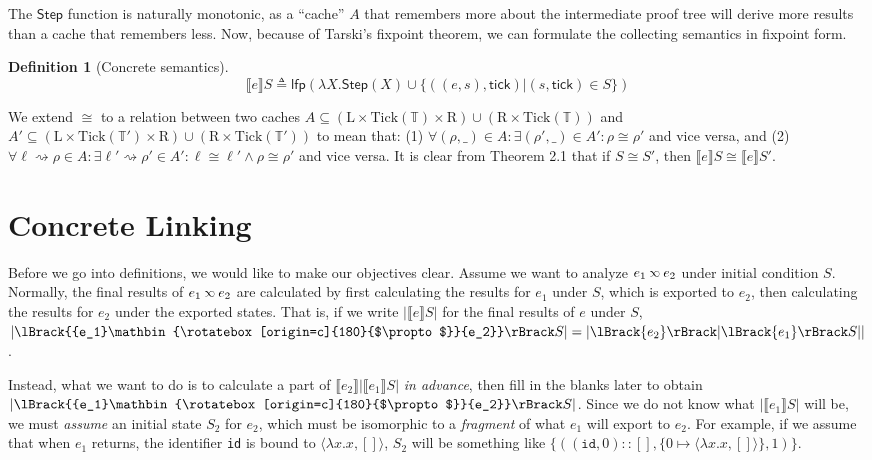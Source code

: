 \documentclass[acmsmall,review]{acmart}\settopmatter{printfolios=true,printccs=false,printacmref=false}
\theoremstyle{definition}
\newtheorem{definition}{Definition}[section]
\newcommand*{\cons}{::}
\newcommand*{\Time}{\mathbb{T}}
\newcommand*{\Left}{\text{L}}
\newcommand*{\Right}{\text{R}}
\newcommand*{\Tick}{\text{Tick}}
\newcommand*{\semarrow}{\rightsquigarrow}
\newcommand*{\semlink}{\mathbin{\rotatebox[origin=c]{180}{$\propto$}}}
\newcommand*{\link}[2]{{#1}\semlink{#2}}
\newcommand*{\sembracket}[1]{\lBrack{#1}\rBrack}
\newcommand*{\tick}{\mathsf{tick}}
\begin{document}
The $\mathsf{Step}$ function is naturally monotonic, as a ``cache'' $A$ that remembers more about the intermediate proof tree will derive more results than a cache that remembers less.
Now, because of Tarski's fixpoint theorem, we can formulate the collecting semantics in fixpoint form.
\begin{definition}[Concrete semantics]
  \[
    \sembracket{e}S\triangleq\mathsf{lfp}(\lambda X.\mathsf{Step}(X)\cup\{((e,s),\tick)|(s,\tick)\in S\})
  \]
\end{definition}
We extend $\cong$ to a relation between two caches $A\subseteq(\Left\times\Tick(\Time)\times\Right )\cup(\Right\times\Tick(\Time))$ and $A'\subseteq(\Left\times\Tick(\Time')\times\Right )\cup(\Right\times\Tick(\Time'))$ to mean that: (1) $\forall(\rho,\_)\in A:\exists(\rho',\_)\in A':\rho\cong\rho'$ and vice versa, and (2) $\forall\ell\semarrow\rho\in A:\exists\ell'\semarrow\rho'\in A':\ell\cong\ell'\wedge\rho\cong\rho'$ and vice versa.
It is clear from Theorem 2.1 that if $S\cong S'$, then $\sembracket{e}S\cong\sembracket{e}S'$.

\section{Concrete Linking}

Before we go into definitions, we would like to make our objectives clear.
Assume we want to analyze $\link{e_1}{e_2}$ under initial condition $S$.
Normally, the final results of $\link{e_1}{e_2}$ are calculated by first calculating the results for $e_1$ under $S$, which is exported to $e_2$, then calculating the results for $e_2$ under the exported states.
That is, if we write $|\sembracket{e}S|$ for the final results of $e$ under $S$, $|\sembracket{\link{e_1}{e_2}}S|=|\sembracket{e_2}|\sembracket{e_1}S||$.

Instead, what we want to do is to calculate a part of $\sembracket{e_2}|\sembracket{e_1}S|$ \emph{in advance}, then fill in the blanks later to obtain $|\sembracket{\link{e_1}{e_2}}S|$.
Since we do not know what $|\sembracket{e_1}S|$ will be, we must \emph{assume} an initial state $S_2$ for $e_2$, which must be isomorphic to a \emph{fragment} of what $e_1$ will export to $e_2$.
For example, if we assume that when $e_1$ returns, the identifier \texttt{id} is bound to $\langle\lambda x.x,[]\rangle$, $S_2$ will be something like $\{((\mathtt{id},0)\cons[],\{0\mapsto\langle\lambda x.x,[]\rangle\},1)\}$.
\end{document}
